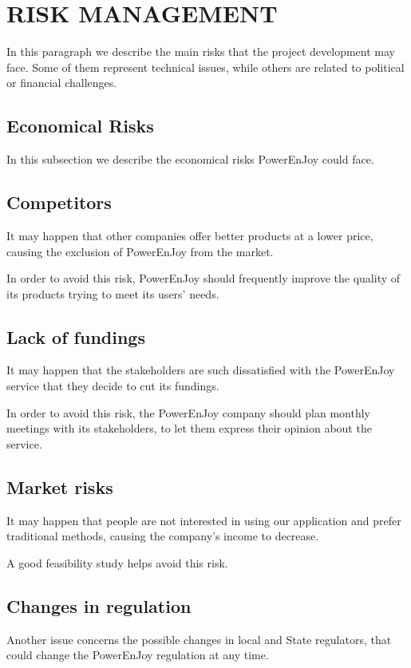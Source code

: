 \section{RISK MANAGEMENT}
In this paragraph we describe the main risks that the project development may face. Some of them represent technical issues, while others are related to political or financial challenges.

\subsection{Economical Risks}
In this subsection we describe the economical risks PowerEnJoy could face.

\subsection*{Competitors}
It may happen that other companies offer better products at a lower price, causing the exclusion of PowerEnJoy from the market. 

In order to avoid this risk, PowerEnJoy should frequently improve the quality of its products trying to meet its users' needs. 

\subsection*{Lack of fundings}
It may happen that the stakeholders are such dissatisfied with the PowerEnJoy service that they decide to cut its fundings. 

In order to avoid this risk, the PowerEnJoy company should plan monthly meetings with its stakeholders, to let them express their opinion about the service.

\subsection*{Market risks}
It may happen that people are not interested in using our application and prefer traditional methods, causing the company's income to decrease.

A good feasibility study helps avoid this risk. 

\subsection*{Changes in regulation}
Another issue concerns the possible changes in local and State regulators, that could change the PowerEnJoy regulation at any time. 

